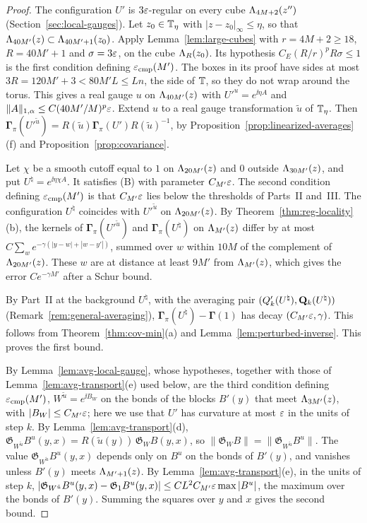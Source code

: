 \begin{proof}
The configuration $U'$ is $3\varepsilon$-regular on every cube $\Lambda_{4M+2}(z'')$ (Section~\ref{sec:local-gauges}). Let $z_0\in\mathbb T_\eta$ with $|z-z_0|_\infty\le\eta$, so that $\Lambda_{40M'}(z)\subset\Lambda_{40M'+1}(z_0)$. Apply Lemma~\ref{lem:large-cubes} with $r=4M+2\ge18$, $R=40M'+1$ and $\sigma=3\varepsilon$, on the cube $\Lambda_R(z_0)$. Its hypothesis $C_E(R/r)^pR\sigma\le1$ is the first condition defining $\varepsilon_{\rm cmp}(M')$. The boxes in its proof have sides at most $3R=120M'+3<80M'L\le Ln$, the side of $\mathbb T$, so they do not wrap around the torus. This gives a real gauge $u$ on $\Lambda_{40M'}(z)$ with $U'^u=e^{\ii\eta A}$ and $\|A\|_{1,\alpha}\le C(40M'/M)^p\varepsilon$. Extend $u$ to a real gauge transformation $\tilde u$ of $\mathbb T_\eta$. Then $\boldsymbol\Gamma_\pi(U'^{\tilde u})=R(\tilde u)\boldsymbol\Gamma_\pi(U')R(\tilde u)^{-1}$, by Proposition~\ref{prop:linearized-averages}(f) and Proposition~\ref{prop:covariance}.

Let $\chi$ be a smooth cutoff equal to $1$ on $\Lambda_{20M'}(z)$ and $0$ outside $\Lambda_{30M'}(z)$, and put $U^\natural=e^{\ii\eta\chi A}$. It satisfies (B) with parameter $C_{M'}\varepsilon$. The second condition defining $\varepsilon_{\rm cmp}(M')$ is that $C_{M'}\varepsilon$ lies below the thresholds of Parts~II and~III. The configuration $U^\natural$ coincides with $U'^{\tilde u}$ on $\Lambda_{20M'}(z)$. By Theorem~\ref{thm:reg-locality}(b), the kernels of $\boldsymbol\Gamma_\pi(U'^{\tilde u})$ and $\boldsymbol\Gamma_\pi(U^\natural)$ on $\Lambda_{M'}(z)$ differ by at most $C\sum_{w}e^{-\gamma(|y-w|+|w-y'|)}$, summed over $w$ within $10M$ of the complement of $\Lambda_{20M'}(z)$. These $w$ are at distance at least $9M'$ from $\Lambda_{M'}(z)$, which gives the error $Ce^{-\gamma M'}$ after a Schur bound.

By Part~II at the background $U^\natural$, with the averaging pair $(Q'_k(U^\natural),\mathbf Q_k(U^\natural))$ (Remark~\ref{rem:general-averaging}), $\boldsymbol\Gamma_\pi(U^\natural)-\boldsymbol\Gamma(1)$ has decay $(C_{M'}\varepsilon,\gamma)$. This follows from Theorem~\ref{thm:cov-min}(a) and Lemma~\ref{lem:perturbed-inverse}. This proves the first bound.

By Lemma~\ref{lem:avg-local-gauge}, whose hypotheses, together with those of Lemma~\ref{lem:avg-transport}(e) used below, are the third condition defining $\varepsilon_{\rm cmp}(M')$, $W^{\tilde u}=e^{\ii B_W}$ on the bonds of the blocks $B'(y)$ that meet $\Lambda_{3M'}(z)$, with $|B_W|\le C_{M'}\varepsilon$; here we use that $U'$ has curvature at most $\varepsilon$ in the units of step $k$. By Lemma~\ref{lem:avg-transport}(d), $\mathfrak G_{W^{\tilde u}}B^u(y,x)=R(\tilde u(y))\,\mathfrak G_WB(y,x)$, so $\|\mathfrak G_WB\|=\|\mathfrak G_{W^{\tilde u}}B^u\|$. The value $\mathfrak G_{W^{\tilde u}}B^u(y,x)$ depends only on $B^u$ on the bonds of $B'(y)$, and vanishes unless $B'(y)$ meets $\Lambda_{M'+1}(z)$. By Lemma~\ref{lem:avg-transport}(e), in the units of step $k$, $|\mathfrak G_{W^{\tilde u}}B^u(y,x)-\mathfrak G_1B^u(y,x)|\le CL^2C_{M'}\varepsilon\max|B^u|$, the maximum over the bonds of $B'(y)$. Summing the squares over $y$ and $x$ gives the second bound.


\end{proof}
